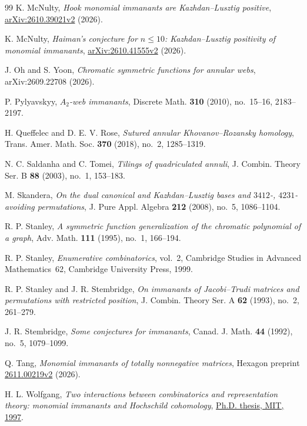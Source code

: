 \documentclass[11pt]{article}
\theoremstyle{definition}
\theoremstyle{remark}
\begin{document}
\begin{thebibliography}{99}
 K. McNulty, \emph{Hook monomial immanants are Kazhdan--Lusztig positive}, \href{https://arxiv.org/abs/2610.39021v2}{arXiv:2610.39021v2} (2026).

 K. McNulty, \emph{Haiman's conjecture for $n\le10$: Kazhdan--Lusztig positivity of monomial immanants}, \href{https://arxiv.org/abs/2610.41555v2}{arXiv:2610.41555v2} (2026).

 J. Oh and S. Yoon, \emph{Chromatic symmetric functions for annular webs}, arXiv:2609.22708 (2026).

 P. Pylyavskyy, \emph{$A_2$-web immanants}, Discrete Math. \textbf{310} (2010), no.~15--16, 2183--2197.

 H. Queffelec and D. E. V. Rose, \emph{Sutured annular Khovanov--Rozansky homology}, Trans. Amer. Math. Soc. \textbf{370} (2018), no.~2, 1285--1319.

 N. C. Saldanha and C. Tomei, \emph{Tilings of quadriculated annuli}, J. Combin. Theory Ser. B \textbf{88} (2003), no.~1, 153--183.

 M. Skandera, \emph{On the dual canonical and Kazhdan--Lusztig bases and $3412$-, $4231$-avoiding permutations}, J. Pure Appl. Algebra \textbf{212} (2008), no.~5, 1086--1104.

 R. P. Stanley, \emph{A symmetric function generalization of the chromatic polynomial of a graph}, Adv. Math. \textbf{111} (1995), no.~1, 166--194.

 R. P. Stanley, \emph{Enumerative combinatorics}, vol.~2, Cambridge Studies in Advanced Mathematics~62, Cambridge University Press, 1999.

 R. P. Stanley and J. R. Stembridge, \emph{On immanants of Jacobi--Trudi matrices and permutations with restricted position}, J. Combin. Theory Ser. A \textbf{62} (1993), no.~2, 261--279.

 J. R. Stembridge, \emph{Some conjectures for immanants}, Canad. J. Math. \textbf{44} (1992), no.~5, 1079--1099.

 Q. Tang, \emph{Monomial immanants of totally nonnegative matrices}, Hexagon preprint \href{https://hexagonmath.org/2611.00219v2}{2611.00219v2} (2026).

 H. L. Wolfgang, \emph{Two interactions between combinatorics and representation theory: monomial immanants and Hochschild cohomology}, \href{https://hdl.handle.net/1721.1/43461}{Ph.D. thesis, MIT, 1997}.

\end{thebibliography}
\endgroup
\end{document}
